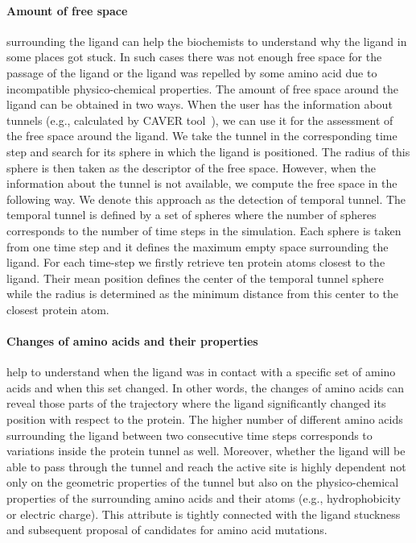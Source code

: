 \documentclass[twocolumn]{bmcart}%
\begin{document}
\paragraph{\textbf{Amount of free space}} surrounding the ligand can help the biochemists to understand why the ligand in some places got stuck.
In such cases there was not enough free space for the passage of the ligand or the ligand was repelled by some amino acid due to incompatible physico-chemical properties.
The amount of free space around the ligand can be obtained in two ways.
When the user has the information about tunnels (e.g., calculated by CAVER tool~\cite{Chovancova2012}), we can use it for the assessment of the free space around the ligand.
We take the tunnel in the corresponding time step and search for its sphere in which the ligand is positioned. 
The radius of this sphere is then taken as the descriptor of the free space.
However, when the information about the tunnel is not available, we compute the free space in the following way.
We denote this approach as the detection of temporal tunnel.
The temporal tunnel is defined by a set of spheres where the number of spheres corresponds to the number of time steps in the simulation.
Each sphere is taken from one time step and it defines the maximum empty space surrounding the ligand.
For each time-step we firstly retrieve ten protein atoms closest to the ligand. 
Their mean position defines the center of the temporal tunnel sphere while the radius is determined as the minimum distance from this center to the closest protein atom.

\paragraph{\textbf{Changes of amino acids and their properties}} help to understand when the ligand was in contact with a specific set of amino acids and when this set changed.
In other words, the changes of amino acids can reveal those parts of the trajectory where the ligand significantly changed its position with respect to the protein. 
The higher number of different amino acids surrounding the ligand between two consecutive time steps corresponds to variations inside the protein tunnel as well.
Moreover, whether the ligand will be able to pass through the tunnel and reach the active site is highly dependent not only on the geometric properties of the tunnel but also on the physico-chemical properties of the surrounding amino acids and their atoms (e.g., hydrophobicity or electric charge).
This attribute is tightly connected with the ligand stuckness and subsequent proposal of candidates for amino acid mutations.
\end{document}
